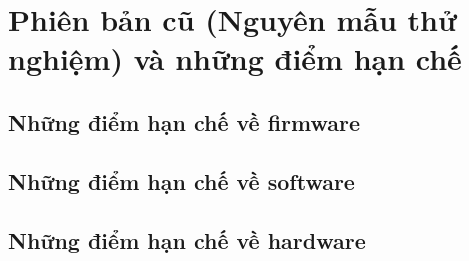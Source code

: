 \section{Phiên bản cũ  (Nguyên mẫu thử nghiệm) và những điểm hạn chế}
    \subsection{Những điểm hạn chế về firmware}
    \subsection{Những điểm hạn chế về software}
    \subsection{Những điểm hạn chế về hardware}
